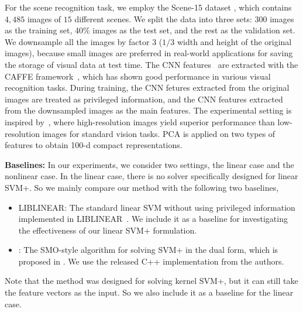 For the scene recognition task, we employ the Scene-15
dataset \citep{scene-15}, which contains $4,485$ images of $15$
different scenes.  We split the data into three sets: $300$ images as
the training set, 40\% images as the test set, and the rest as the
validation set.  We downsample all the images by factor $3$ ($1/3$
width and height of the original images), because small images are
preferred in real-world applications for saving the storage of visual
data at test time.  The CNN features~\citep{deepnet:nips12} are
extracted with the CAFFE framework~\citep{caffe}, which has shown good
performance in various visual recognition tasks. During training, the
CNN fetures extracted from the original images are treated as
privileged information, and the CNN features extracted from the
downsampled images as the main features. The experimental setting is
inspired by~\citep{SR4VTs:wacv16}, where high-resolution images yield
superior performance than low-resolution images for standard vision
tasks. PCA is applied on two types of features to obtain 100-d
compact representations.

\noindent\textbf{Baselines:}
In our experiments, we consider two settings, the linear case and the
nonlinear case. In the linear case, there is no solver specifically
designed for linear SVM+. So we mainly compare our method with the
following two baselines,
\begin{itemize}
\setlength\itemsep{-2pt}
\item LIBLINEAR: The standard linear SVM without using privileged information implemented in LIBLINEAR~\citep{liblinear}. We include it as a baseline for investigating the effectiveness of our linear SVM+ formulation.
\item \casmo: The SMO-style algorithm for solving SVM+ in the dual form, which is proposed in \citep{Pechyony2010}. We use the released C++ implementation from the authors.
\end{itemize}
Note that the \casmo method was designed for solving kernel SVM+, but
it can still take the feature vectors as the input. So we also include
it as a baseline for the linear case.

